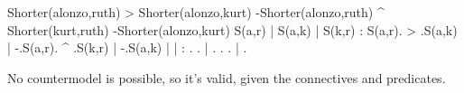 \problems
{}
\argument
 Shorter(alonzo,ruth) > Shorter(alonzo,kurt)
 -Shorter(alonzo,ruth) ^ Shorter(kurt,ruth)
\argumentline
 -Shorter(alonzo,kurt)
\endargument
	\answer
	\truthtable
	 S(a,r) | S(a,k) | S(k,r) : S(a,r). > .S(a,k) | -.S(a,r). ^ .S(k,r) | -.S(a,k)
	\truthtableline
	        |        |        :       .   .       |  .      .   .       |  .   
	\endtruthtable
	
	\heightmodel
	 
	\endheightmodel
	\OR
	No countermodel is possible, so it's valid, given the connectives and predicates.
	\endanswer

\endproblems
\bye
